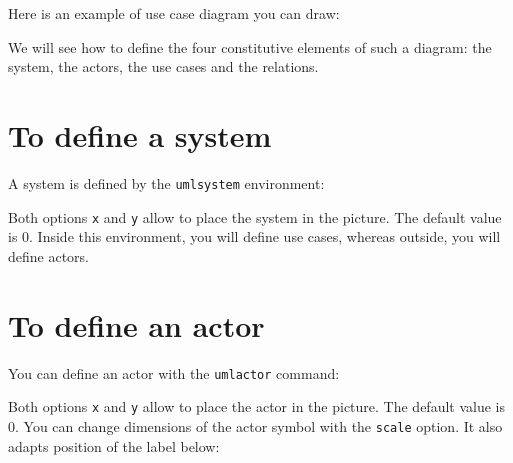 \documentclass[a4paper,11pt]{report}
\begin{document}
Here is an example of use case diagram you can draw:

\begin{center}
\end{center}

We will see how to define the four constitutive elements of such a diagram: the system, the actors, the use cases and the relations.

\section{To define a system}\label{s.system}

A system is defined by the {\tt umlsystem} environment:

\medskip

\begin{minipage}{0.6\textwidth}

\end{minipage}
\begin{minipage}{0.4\textwidth}
\begin{center}
\end{center}
\end{minipage}

\medskip

Both options {\tt x} and {\tt y} allow to place the system in the picture. The default value is 0. Inside this environment, you will define use cases, whereas outside, you will define actors.

\section{To define an actor}\label{s.actor}

You can define an actor with the {\tt umlactor} command:

\medskip

\begin{minipage}{0.6\textwidth}

\end{minipage}
\begin{minipage}{0.4\textwidth}
\begin{center}
\end{center}
\end{minipage}

\medskip

Both options {\tt x} and {\tt y} allow to place the actor in the picture. The default value is 0. You can change dimensions of the actor symbol with the {\tt scale} option. It also adapts position of the label below:
\end{document}
